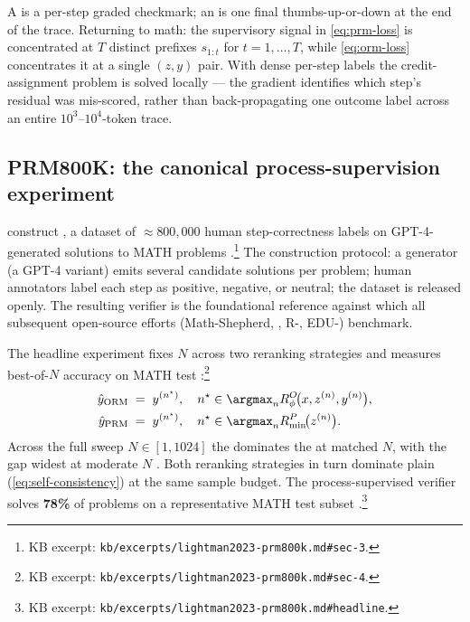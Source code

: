 \begin{intuition}
A  is a per-step graded checkmark; an  is one final
thumbs-up-or-down at the end of the trace. Returning to math: the
supervisory signal in \cref{eq:prm-loss} is concentrated at $T$
distinct prefixes $s_{1:t}$ for $t = 1, \ldots, T$, while
\cref{eq:orm-loss} concentrates it at a single $(z, y)$ pair. With
dense per-step labels the credit-assignment problem is solved
locally — the gradient identifies which step's residual was
mis-scored, rather than back-propagating one outcome label across an
entire $10^3$--$10^4$-token trace.
\end{intuition}

\subsection{PRM800K: the canonical process-supervision experiment}
\label{sec:prm-prm800k}

\citet{lightman2023-prm800k} construct \textbf{}, a dataset of
$\approx 800{,}000$ human step-correctness labels on GPT-4-generated
solutions to MATH problems \citep[\S 3]{lightman2023-prm800k}.\footnote{KB
excerpt: \nolinkurl{kb/excerpts/lightman2023-prm800k.md#sec-3}.} The
construction protocol: a generator (a GPT-4 variant) emits several
candidate solutions per problem; human annotators label each step as
positive, negative, or neutral; the dataset is released openly. The
resulting verifier is the foundational reference  against which all
subsequent open-source efforts (Math-Shepherd, , R-,
EDU-) benchmark.

The headline experiment fixes $N$ across two reranking strategies and
measures best-of-$N$ accuracy on MATH test
\citep[\S 4]{lightman2023-prm800k}:\footnote{KB excerpt:
\nolinkurl{kb/excerpts/lightman2023-prm800k.md#sec-4}.}
\begin{align}
  \hat y_\text{ORM} \;&=\; y^{(n^\star)}, \quad n^\star \in \argmax_n R^O_\phi\!\bigl(x, z^{(n)}, y^{(n)}\bigr), \label{eq:bon-orm} \\
  \hat y_\text{PRM} \;&=\; y^{(n^\star)}, \quad n^\star \in \argmax_n R^P_{\min}\!\bigl(z^{(n)}\bigr). \label{eq:bon-prm}
\end{align}
Across the full sweep $N \in [1, 1024]$ the  dominates the  at
matched $N$, with the gap widest at moderate $N$
\citep[Fig. 4]{lightman2023-prm800k}. Both reranking strategies in
turn dominate plain 
(\cref{eq:self-consistency}) at the same sample budget. The
process-supervised verifier solves \textbf{78\%} of problems on a
representative MATH test subset
\citep[abstract]{lightman2023-prm800k}.\footnote{KB excerpt:
\nolinkurl{kb/excerpts/lightman2023-prm800k.md#headline}.}

